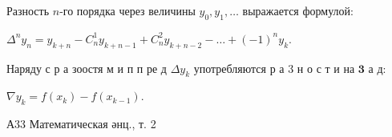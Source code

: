 \documentclass[10pt]{article}
\begin{document}
Разность $n$-го порядка через величины $y_{0}, y_{1}, \ldots$ выражается формулой:



$\Delta^{n} y_{n}=y_{k+n}-C_{n}^{1} y_{k+n-1}+C_{n}^{2} y_{k+n-2}-\ldots+(-1)^{n} y_{k}$.



Наряду с р а зоостя м и п п ре д $\Delta y_{k}$ употребляются р а 3 н о с т и на $\mathbf{3}$ а д:



$\nabla y_{k}=f\left(x_{k}\right)-f\left(x_{k-1}\right)$.



А33 Математическая әнц., т. 2
\end{document}
